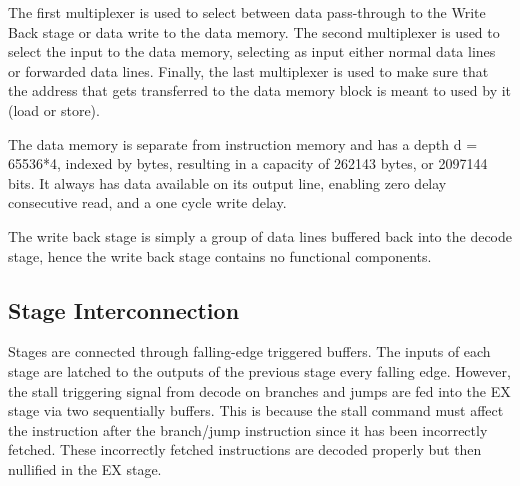 \documentclass[12pt]{IEEEtran} %
\begin{document}
The first multiplexer is used to select between data pass-through to the Write Back stage or data write to the data memory. The second multiplexer is used to select the input to the data memory, selecting as input either normal data lines or forwarded data lines. Finally, the last multiplexer is used to make sure that the address that gets transferred to the data memory block is meant to used by it (load or store).

The data memory is separate from instruction memory and has a depth d = 65536*4, indexed by bytes, resulting in a capacity of 262143 bytes, or 2097144 bits. It always has data available on its output line, enabling zero delay consecutive read, and a one cycle write delay.

The write back stage is simply a group of data lines buffered back into the decode stage, hence the write back stage contains no functional components. 


\subsection{Stage Interconnection} %
\label{sub:stage_interconnection}
Stages are connected through falling-edge triggered buffers. The inputs of each stage are latched to the outputs of the previous stage every falling edge. However, the stall triggering signal from decode on branches and jumps are fed into the EX stage via two sequentially buffers. This is because the stall command must affect the instruction after the branch/jump instruction since it has been incorrectly fetched. These incorrectly fetched instructions are decoded properly but then nullified in the EX stage.
\end{document}
